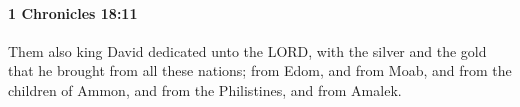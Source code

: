 
		\paragraph{1 Chronicles 18:11} %
			\label{1CHRONICLES-18-11}

			Them also king David dedicated unto the LORD, with the silver and the gold that he brought from all these nations; from Edom, and from Moab, and from the children of Ammon, and from the Philistines, and from Amalek.


